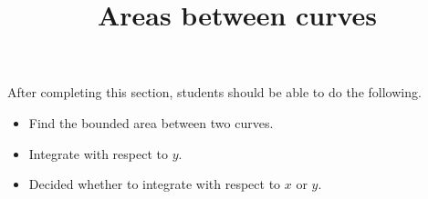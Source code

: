 \documentclass{ximera}
\title{Areas between curves}
\begin{document}
\begin{abstract}
\end{abstract}

\maketitle

\begin{sectionOutcomes}

After completing this section, students should be able to do the following.

\begin{itemize}
\item Find the bounded area between two curves.
\item Integrate with respect to $y$.
\item Decided whether to integrate with respect to $x$ or $y$.
\end{itemize}

\end{sectionOutcomes}
\end{document}
